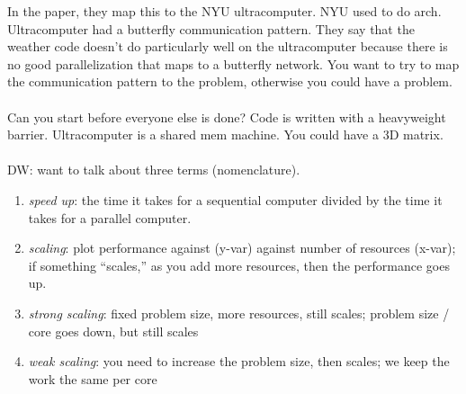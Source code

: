 In the paper, they map this to the NYU ultracomputer.
NYU used to do arch.
Ultracomputer had a butterfly communication pattern.
They say that the weather code doesn't do particularly well on the ultracomputer because there is no good parallelization that maps to a butterfly network.
You want to try to map the communication pattern to the problem, otherwise you could have a problem.
\\ \\
Can you start before everyone else is done?
Code is written with a heavyweight barrier.
Ultracomputer is a shared mem machine.
You could have a 3D matrix.
\\ \\
DW: want to talk about three terms (nomenclature).
\begin{enumerate}
    \item \textit{speed up}: the time it takes for a sequential computer divided by the time it takes for a parallel computer.
    \item \textit{scaling}: plot performance against (y-var) against number of resources (x-var); if something ``scales,'' as you add more resources, then the performance goes up.
    \item \textit{strong scaling}: fixed problem size, more resources, still scales; problem size / core goes down, but still scales
    \item \textit{weak scaling}: you need to increase the problem size, then scales; we keep the work the same per core
\end{enumerate}



